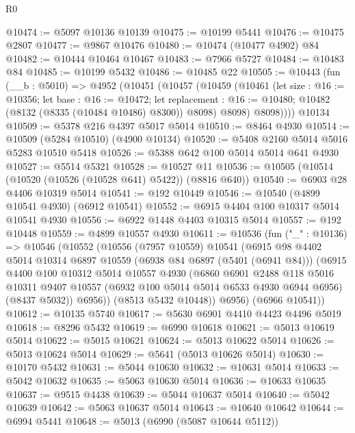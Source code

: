 \begin{lexlean}{R0}
\begin{coremodule}
@10474 := @5097 @10136 @10139
@10475 := @10199 @5441
@10476 := @10475 @2807
@10477 := @9867 @10476
@10480 := @10474 (@10477 @4902) @84
@10482 := @10444 @10464 @10467
@10483 := @7966 @5727
@10484 := @10483 @84
@10485 := @10199 @5432
@10486 := @10485 @22
@10505 := @10443
    (fun (__b : @5010) =>
    @4952
      (@10451
        (@10457
          (@10459
            (@10461
              (let size : @16 := @10356;
              let base : @16 := @10472;
              let replacement : @16 := @10480; @10482 (@8132 (@8335 (@10484 @10486) @8300)) @8098)
              @8098)
            @8098))))
    @10134
@10509 := @5378 @216 @4397 @5017 @5014
@10510 := @8464 @4930
@10514 := @10509 (@5284 @10510) (@4900 @10134)
@10520 := @5408 @2160 @5014 @5016 @5283 @10510 @5418
@10526 := @5388 @642 @100 @5014 @5014 @641 @4930
@10527 := @5514 @5321
@10528 := @10527 @11
@10536 := @10505 (@10514 (@10520 (@10526 (@10528 @641) @5422)) (@8816 @640))
@10540 := @6903 @28 @4406 @10319 @5014
@10541 := @192 @10449
@10546 := @10540 (@4899 @10541 @4930) (@6912 @10541)
@10552 := @6915 @4404 @100 @10317 @5014 @10541 @4930
@10556 := @6922 @1448 @4403 @10315 @5014
@10557 := @192 @10448
@10559 := @4899 @10557 @4930
@10611 := @10536
    (fun ("_" : @10136) =>
    @10546
      (@10552
        (@10556
          (@7957 @10559)
          @10541
          (@6915
            @98
            @4402
            @5014
            @10314
            @6897
            @10559
            (@6938 @84 @6897 (@5401 (@6941 @84)))
            (@6915
              @4400
              @100
              @10312
              @5014
              @10557
              @4930
              (@6860
                @6901
                @2488
                @118
                @5016
                @10311
                @9407
                @10557
                (@6932 @100 @5014 @5014 @6533 @4930 @6944 @6956)
                (@8437 @5032))
              @6956))
          (@8513 @5432 @10448))
        @6956)
      (@6966 @10541))
@10612 := @10135 @5740
@10617 := @5630 @6901 @4410 @4423 @4496 @5019
@10618 := @8296 @5432
@10619 := @6990 @10618
@10621 := @5013 @10619 @5014
@10622 := @5015 @10621
@10624 := @5013 @10622 @5014
@10626 := @5013 @10624 @5014
@10629 := @5641 (@5013 @10626 @5014)
@10630 := @10170 @5432
@10631 := @5044 @10630
@10632 := @10631 @5014
@10633 := @5042 @10632
@10635 := @5063 @10630 @5014
@10636 := @10633 @10635
@10637 := @9515 @4438
@10639 := @5044 @10637 @5014
@10640 := @5042 @10639
@10642 := @5063 @10637 @5014
@10643 := @10640 @10642
@10644 := @6994 @5441
@10648 := @5013 (@6990 (@5087 @10644 @5112))

\end{coremodule}
\end{lexlean}
